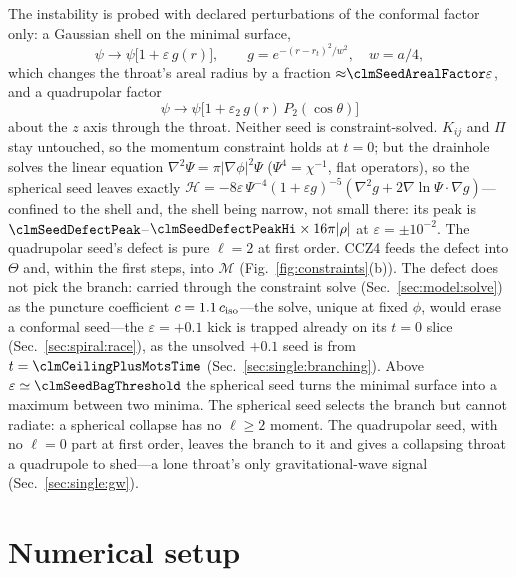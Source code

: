 \documentclass[twocolumn,floatfix,aps,prd,superscriptaddress,nofootinbib]{revtex4-2}
\begin{document}
The instability is probed with declared perturbations of the conformal factor only: a Gaussian shell on the minimal surface,
\begin{equation}
\psi \to \psi\bigl[1 + \varepsilon\, g(r)\bigr],\qquad
g = e^{-(r-r_t)^2/w^2},\quad w = a/4,
\label{eq:seed}
\end{equation}
which changes the throat's areal radius by a fraction ${\approx}\clmSeedArealFactor\varepsilon$, and a quadrupolar factor
\begin{equation}
\psi \to \psi\bigl[1 + \varepsilon_2\, g(r)\,P_2(\cos\theta)\bigr]
\end{equation}
about the $z$ axis through the throat. Neither seed is constraint-solved. $K_{ij}$ and $\Pi$ stay untouched, so the momentum constraint holds at $t=0$; but the drainhole solves the linear equation $\nabla^2\Psi=\pi|\nabla\phi|^2\Psi$ ($\Psi^4=\chi^{-1}$, flat operators), so the spherical seed leaves exactly $\mathcal H=-8\varepsilon\,\Psi^{-4}(1+\varepsilon g)^{-5}(\nabla^2g+2\nabla\ln\Psi\cdot\nabla g)$---confined to the shell and, the shell being narrow, not small there: its peak is $\clmSeedDefectPeak$--$\clmSeedDefectPeakHi\times16\pi|\rho|$ at $\varepsilon=\pm10^{-2}$. The quadrupolar seed's defect is pure $\ell=2$ at first order. CCZ4 feeds the defect into $\Theta$ and, within the first steps, into $\mathcal M$ (Fig.~\ref{fig:constraints}(b)). The defect does not pick the branch: carried through the constraint solve (Sec.~\ref{sec:model:solve}) as the puncture coefficient $c=1.1\,c_{\rm iso}$---the solve, unique at fixed $\phi$, would erase a conformal seed---the $\varepsilon=+0.1$ kick is trapped already on its $t=0$ slice (Sec.~\ref{sec:spiral:race}), as the unsolved $+0.1$ seed is from $t=\clmCeilingPlusMotsTime$ (Sec.~\ref{sec:single:branching}). Above $\varepsilon\simeq\clmSeedBagThreshold$ the spherical seed turns the minimal surface into a maximum between two minima. The spherical seed selects the branch but cannot radiate: a spherical collapse has no $\ell\ge2$ moment. The quadrupolar seed, with no $\ell=0$ part at first order, leaves the branch to it and gives a collapsing throat a quadrupole to shed---a lone throat's only gravitational-wave signal (Sec.~\ref{sec:single:gw}).

\section{Numerical setup}
\label{sec:setup}
\end{document}
